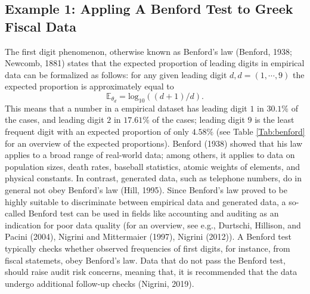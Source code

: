 \documentclass[
  english,
  man,floatsintext]{apa6}
\begin{document}
\hypertarget{example-1-appling-a-benford-test-to-greek-fiscal-data}{%
\subsection{Example 1: Appling A Benford Test to Greek Fiscal Data}\label{example-1-appling-a-benford-test-to-greek-fiscal-data}}

The first digit phenomenon, otherwise known as Benford's law (Benford, 1938; Newcomb, 1881) states that the expected proportion of leading digits in empirical data can be formalized as follows: for any given leading digit \(d, d = (1, \cdots, 9)\) the expected proportion is approximately equal to \[\mathbb{E}_{\theta_d}= \text{log}_{10}((d + 1)/d).\] This means that a number in a empirical dataset has leading digit \(1\) in \(30.1 \%\) of the cases, and leading digit \(2\) in \(17.61 \%\) of the cases; leading digit \(9\) is the least frequent digit with an expected proportion of only \(4.58 \%\) (see Table \ref{Tab:benford} for an overview of the expected proportions). Benford (1938) showed that his law applies to a broad range of real-world data; among others, it applies to data on population sizes, death rates, baseball statistics, atomic weights of elements, and physical constants. In contrast, generated data, such as telephone numbers, do in general not obey Benford's law (Hill, 1995). Since Benford's law proved to be highly suitable to discriminate between empirical data and generated data, a so-called Benford test can be used in fields like accounting and auditing as an indication for poor data quality (for an overview, see e.g., Durtschi, Hillison, and Pacini (2004), Nigrini and Mittermaier (1997), Nigrini (2012)). A Benford test typically checks whether observed frequencies of first digits, for instance, from fiscal statemets, obey Benford's law. Data that do not pass the Benford test, should raise audit risk concerns, meaning that, it is recommended that the data undergo additional follow-up checks (Nigrini, 2019).
\end{document}
